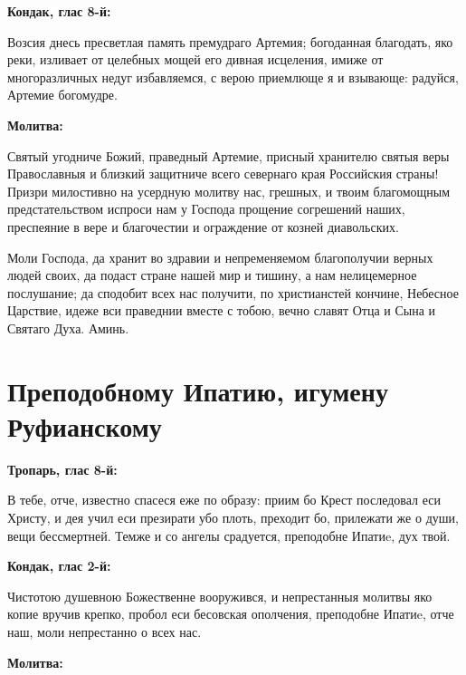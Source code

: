 \medskip


\bfseries Кондак, глас 8-й:\normalfont{}\nopagebreak


Возсия днесь пресветлая память премудраго Артемия; богоданная благодать, яко реки, изливает от целебных мощей его дивная исцеления, имиже от многоразличных недуг избавляемся, с верою приемлюще я и взывающе: радуйся, Артемие богомудре.


\medskip


\bfseries Молитва:\normalfont{}\nopagebreak


Святый угодниче Божий, праведный Артемие, присный хранителю святыя веры Православныя и близкий защитниче всего севернаго края Российския страны! Призри милостивно на усердную молитву нас, грешных, и твоим благомощным предстательством испроси нам у Господа прощение согрешений наших, преспеяние в вере и благочестии и ограждение от козней диавольских. 

Моли Господа, да хранит во здравии и непременяемом благополучии верных людей своих, да подаст стране нашей мир и тишину, а нам нелицемерное послушание; да сподобит всех нас получити, по христианстей кончине, Небесное Царствие, идеже вси праведнии вместе с тобою, вечно славят Отца и Сына и Святаго Духа. Аминь.
\mychapterending


 

\section{Преподобному Ипатию, игумену Руфианскому}
 


\bfseries Тропарь, глас 8-й:\normalfont{}\nopagebreak


В тебе, отче, известно спасеся еже по образу: приим бо Крест последовал еси Христу, и дея учил еси презирати убо плоть, преходит бо, прилежати же о души, вещи бессмертней.  Темже и со ангелы срадуется, преподобне Ипатиe, дух твой.


\medskip


\bfseries Кондак, глас 2-й:\normalfont{}\nopagebreak


Чистотою душевною Божественне вооружився, и непрестанныя молитвы яко копие вручив крепко, пробол еси бесовская ополчения, преподобне Ипатиe, отче наш, моли непрестанно о всех нас.


\medskip


\bfseries Молитва:\normalfont{}\nopagebreak


